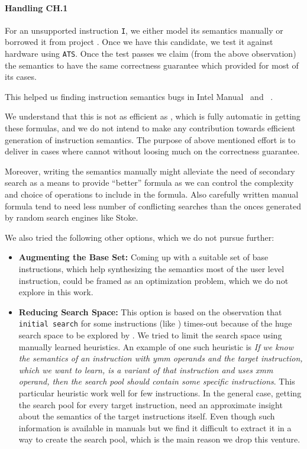       
    \paragraph{Handling CH.1} For an unsupported instruction {\tt I}, we either
    model its semantics  manually or borrowed it from project \Stoke.   Once we
    have this candidate, we test it against hardware using {\tt ATS}.  Once the
    test passes we claim (from the above observation) the semantics to have the
    same correctness guarantee which \Strata provided for most of its cases.
    
    This helped us finding instruction semantics bugs in Intel
    Manual~\cite{BugIntel} and \Stoke~\cite{BugStoke983}.
    
    We understand that this is not as efficient as \Stoke, which is fully
    automatic in getting these formulas, and we do not intend to make any
    contribution towards efficient generation of instruction semantics. The
    purpose of above mentioned effort is to deliver in cases where \Stoke cannot
    without loosing much on the correctness guarantee. 
   
   Moreover, writing the semantics manually might alleviate the need of
   secondary search as a means to provide ``better'' formula as we can control
   the complexity and choice of operations to include in the formula. Also
   carefully written manual formula tend to need less number of conflicting
   searches than the onces generated by random search engines like Stoke.
   
   We also tried the following other options, which we do not pursue further:
   \begin{itemize}
       \item \textbf{Augmenting the Base Set: }
       Coming up with a suitable set of base instructions, which help 
       synthesizing the semantics most of the user level instruction, could be framed 
       as an optimization problem, which we do not explore in this work.  
       
       \item \textbf{Reducing \Stoke Search Space: }This option is based
       on the observation that {\tt initial search} for some instructions (like
       ) times-out because of the
       huge search space to be explored by \Stoke. We tried to limit the search
       space using manually learned heuristics. An example of one such heuristic is
       \emph{ If we know the semantics of an instruction with ymm operands and the
           target instruction, which we want to learn, is a variant of that
           instruction and uses xmm operand, then the search pool should contain
           some specific instructions}. This particular heuristic  work well for few
       instructions. In the general case, getting the search pool for every
       target instruction, need an approximate insight about the semantics of
       the target instructions itself. Even though such information is available
       in manuals but we find it difficult to extract it in a way to create the
       search pool, which is the main reason we drop this venture.
   \end{itemize} 
    
